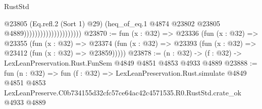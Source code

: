 \begin{lexlean}{RustStd}
\begin{coremodule}
                                            @23805
                                            (Eq.refl.{2} (Sort 1) @29)
                                            (heq_of_eq.{1}
                                              @4874
                                              @23802
                                              @23805
                                              @4889)))))))))))))))))))))
@23870 := fun (x : @32) =>
  @23336
    (fun (x : @32) =>
    @23355
      (fun (x : @32) =>
      @23374 (fun (x : @32) => @23393 (fun (x : @32) => @23412 (fun (x : @32) => @23859)))))
@23878 := (n : @32) -> (f : @32) -> LexLeanPreservation.Rust.FunSem @4849 @4851 @4853 @4933 @4889
@23888 := fun (n : @32) =>
  fun (f : @32) =>
  LexLeanPreservation.Rust.simulate
    @4849
    @4851
    @4853
    LexLeanPreserve.C0b734155d32cfc57ce64ac42c4571535.R0.RustStd.crate_ok
    @4933
    @4889
\end{coremodule}
\end{lexlean}

